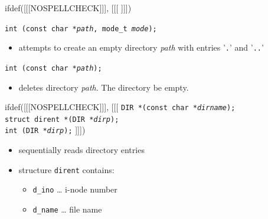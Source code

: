 
ifdef([[[NOSPELLCHECK]]], [[[
]]])

\begin{slide}
\texttt{int (const char *\emph{path}, mode\_t \emph{mode});}
\begin{itemize}
\item attempts to create an empty directory \emph{path} with entries
'\texttt{.}' and '\texttt{..}'
\end{itemize}
\texttt{int (const char *\emph{path});}
\begin{itemize}
\item deletes directory \emph{path}.  The directory  be empty.
\end{itemize}
ifdef([[[NOSPELLCHECK]]], [[[
\texttt{DIR *(const char *\emph{dirname});}\\
\texttt{struct dirent *(DIR *\emph{dirp});}\\
\texttt{int (DIR *\emph{dirp});}
]]])
\begin{itemize}
\item sequentially reads directory entries
\item structure \texttt{dirent} contains:
    \begin{itemize}
    \item \texttt{d\_ino} \dots{} i-node number
    \item \texttt{d\_name} \dots{} file name
    \end{itemize}
\end{itemize}
\end{slide}

